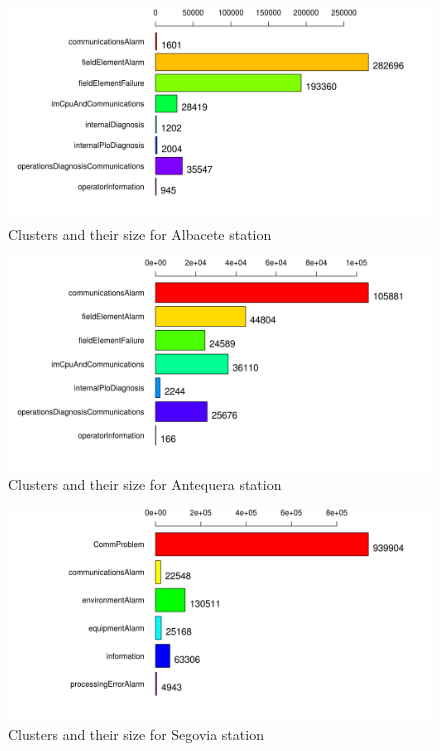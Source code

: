 \begin{figure}[hbtp]
\includegraphics[width=\textwidth]{img/clusters_alb.png}
\caption{Clusters and their size for Albacete station} \label{fig:clusters_alb}
\end{figure}

\begin{figure}[hbtp]
\includegraphics[width=\textwidth]{img/clusters_ant.png}
\caption{Clusters and their size for Antequera station} \label{fig:clusters_ant}
\end{figure}

\begin{figure}[hbtp]
\includegraphics[width=\textwidth]{img/clusters_seg.png}
\caption{Clusters and their size for Segovia station} \label{fig:clusters_seg}
\end{figure}


